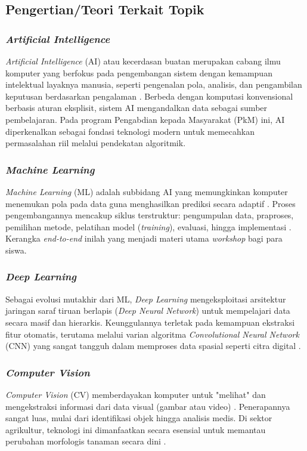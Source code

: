 \subsection{Pengertian/Teori Terkait Topik}

\subsubsection{\textit{Artificial Intelligence}}
\textit{Artificial Intelligence} (AI) atau kecerdasan buatan merupakan cabang ilmu komputer yang berfokus pada pengembangan sistem dengan kemampuan intelektual layaknya manusia, seperti pengenalan pola, analisis, dan pengambilan keputusan berdasarkan pengalaman \parencite{Nadzinski2023, Panjaitan2025}. Berbeda dengan komputasi konvensional berbasis aturan eksplisit, sistem AI mengandalkan data sebagai sumber pembelajaran. Pada program Pengabdian kepada Masyarakat (PkM) ini, AI diperkenalkan sebagai fondasi teknologi modern untuk memecahkan permasalahan riil melalui pendekatan algoritmik.

\subsubsection{\textit{Machine Learning}}
\textit{Machine Learning} (ML) adalah subbidang AI yang memungkinkan komputer menemukan pola pada data guna menghasilkan prediksi secara adaptif \parencite{TofanDwiTjahyono2025}. Proses pengembangannya mencakup siklus terstruktur: pengumpulan data, praproses, pemilihan metode, pelatihan model (\textit{training}), evaluasi, hingga implementasi \parencite{Wibowo2026}. Kerangka \textit{end-to-end} inilah yang menjadi materi utama \textit{workshop} bagi para siswa.

\subsubsection{\textit{Deep Learning}}
Sebagai evolusi mutakhir dari ML, \textit{Deep Learning} mengeksploitasi arsitektur jaringan saraf tiruan berlapis (\textit{Deep Neural Network}) untuk mempelajari data secara masif dan hierarkis. Keunggulannya terletak pada kemampuan ekstraksi fitur otomatis, terutama melalui varian algoritma \textit{Convolutional Neural Network} (CNN) yang sangat tangguh dalam memproses data spasial seperti citra digital \parencite{Nadzinski2023}.

\subsubsection{\textit{Computer Vision}}
\textit{Computer Vision} (CV) memberdayakan komputer untuk "melihat" dan mengekstraksi informasi dari data visual (gambar atau video) \parencite{Imanulloh2023}. Penerapannya sangat luas, mulai dari identifikasi objek hingga analisis medis. Di sektor agrikultur, teknologi ini dimanfaatkan secara esensial untuk memantau perubahan morfologis tanaman secara dini \parencite{MarwanRamdhanyEdy2025}.

